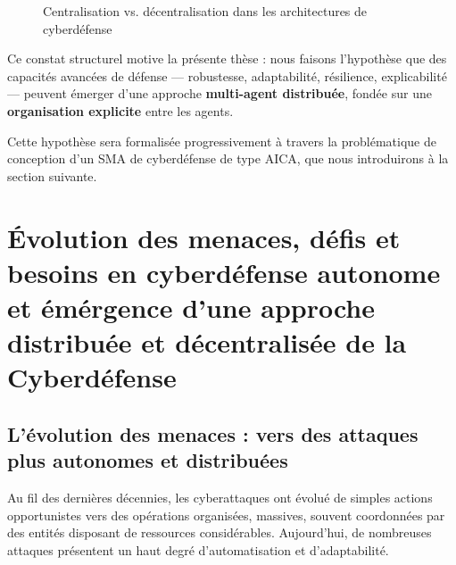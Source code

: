 \documentclass[ twoside,openright,titlepage,numbers=noenddot,headinclude,%
                footinclude=true,cleardoublepage=empty,abstractoff, %
                BCOR=5mm,paper=a4,fontsize=11pt,%
                french,american,%
                ]{scrreprt}
\begin{document}
\begin{figure}[H]
    \centering
    \caption{Centralisation vs. décentralisation dans les architectures de cyberdéfense}
    \label{fig:central-vs-multiagent}
\end{figure}

Ce constat structurel motive la présente thèse : nous faisons l’hypothèse que des capacités avancées de défense — robustesse, adaptabilité, résilience, explicabilité — peuvent émerger d’une approche \textbf{multi-agent distribuée}, fondée sur une \textbf{organisation explicite} entre les agents.

Cette hypothèse sera formalisée progressivement à travers la problématique de conception d’un SMA de cyberdéfense de type AICA, que nous introduirons à la section suivante.


\section{Évolution des menaces, défis et besoins en cyberdéfense autonome et émérgence d'une approche distribuée et décentralisée de la Cyberdéfense}\label{sec:evolution-menaces}


\subsection*{L’évolution des menaces : vers des attaques plus autonomes et distribuées}

Au fil des dernières décennies, les cyberattaques ont évolué de simples actions opportunistes vers des opérations organisées, massives, souvent coordonnées par des entités disposant de ressources considérables. Aujourd’hui, de nombreuses attaques présentent un haut degré d’automatisation et d’adaptabilité.
\end{document}
